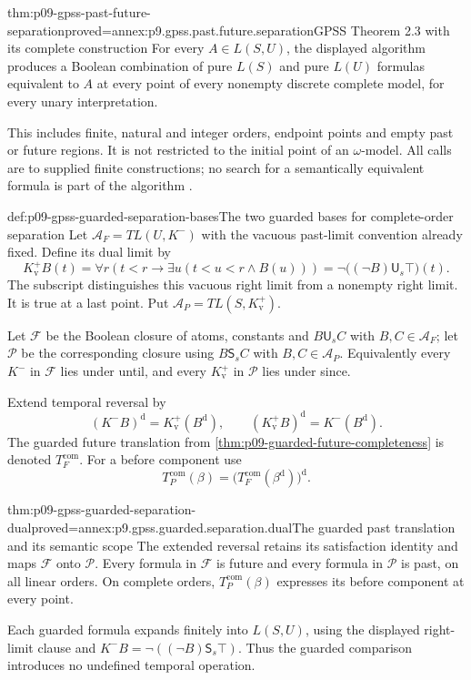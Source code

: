 \begin{hbtheorem}{thm:p09-gpss-past-future-separation}{proved=annex:p9.gpss.past.future.separation}{GPSS Theorem 2.3 with its complete construction}
For every \(A\in L(S,U)\), the displayed
algorithm produces a Boolean combination
of pure \(L(S)\) and pure \(L(U)\) formulas
equivalent to \(A\) at every point of every
nonempty discrete complete model, for every
unary interpretation.

This includes finite, natural and integer
orders, endpoint points and empty past or
future regions. It is not restricted to
the initial point of an \(\omega\)-model.
All calls are to supplied finite constructions;
no search for a semantically equivalent formula
is part of the algorithm
\cite[Theorem~2.3, p.~170]{GabbayPnueliShelahStavi1980}.
\end{hbtheorem}

\begin{hbdefinition}{def:p09-gpss-guarded-separation-bases}{The two guarded bases for complete-order separation}
Let \(\mathcal A_F=TL(U,K^-)\) with the
vacuous past-limit convention already fixed.
Define its dual limit by
\[
 K^+_{\mathrm v}B(t)=
       \forall r\left(t<r\to
                    \exists u(t<u<r\land B(u))\right)
       =\neg\bigl((\neg B)\mathbin{\mathsf U_s}\top\bigr)(t).
\]
The subscript distinguishes this vacuous
right limit from a nonempty right limit.
It is true at a last point.
Put \(\mathcal A_P=TL(S,K^+_{\mathrm v})\).

Let \(\mathcal F\) be the Boolean closure
of atoms, constants and \(B\mathbin{\mathsf U_s}C\)
with \(B,C\in\mathcal A_F\); let \(\mathcal P\)
be the corresponding closure using
\(B\mathbin{\mathsf S_s}C\) with
\(B,C\in\mathcal A_P\).
Equivalently every \(K^-\) in \(\mathcal F\)
lies under until, and every \(K^+_{\mathrm v}\)
in \(\mathcal P\) lies under since.

Extend temporal reversal by
\[
               (K^-B)^{\mathrm d}
                    =K^+_{\mathrm v}(B^{\mathrm d}),\qquad
               (K^+_{\mathrm v}B)^{\mathrm d}
                    =K^-(B^{\mathrm d}).
\]
The guarded future translation from
\cref{thm:p09-guarded-future-completeness}
is denoted \(T_F^{\mathrm{com}}\).
For a before component use
\[
        T_P^{\mathrm{com}}(\beta)=
           \bigl(T_F^{\mathrm{com}}
                            (\beta^{\mathrm d})\bigr)^{\mathrm d}.
\]
\end{hbdefinition}

\begin{hblemma}{thm:p09-gpss-guarded-separation-dual}{proved=annex:p9.gpss.guarded.separation.dual}{The guarded past translation and its semantic scope}
The extended reversal retains its satisfaction
identity and maps \(\mathcal F\) onto
\(\mathcal P\). Every formula in
\(\mathcal F\) is future and every formula
in \(\mathcal P\) is past, on all linear
orders. On complete orders,
\(T_P^{\mathrm{com}}(\beta)\) expresses its
before component at every point.

Each guarded formula expands finitely into
\(L(S,U)\), using the displayed right-limit
clause and
\(K^-B=\neg((\neg B)\mathbin{\mathsf S_s}\top)\).
Thus the guarded comparison introduces no
undefined temporal operation.
\end{hblemma}

